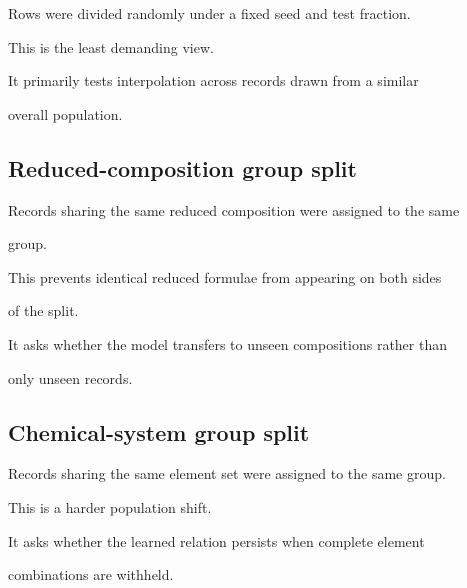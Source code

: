 \documentclass[11pt,a4paper,oneside]{report}
\begin{document}
Rows were divided randomly under a fixed seed and test fraction.



This is the least demanding view.



It primarily tests interpolation across records drawn from a similar

overall population.





\subsection{Reduced-composition group split}



Records sharing the same reduced composition were assigned to the same

group.



This prevents identical reduced formulae from appearing on both sides

of the split.



It asks whether the model transfers to unseen compositions rather than

only unseen records.





\subsection{Chemical-system group split}



Records sharing the same element set were assigned to the same group.



This is a harder population shift.



It asks whether the learned relation persists when complete element

combinations are withheld.
\end{document}
